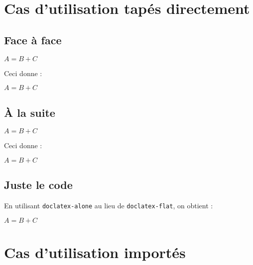 \section{Cas d'utilisation tapés directement}

\subsection{Face à face}

\begin{doclatex-alone}
\begin{doclatex}
    $A = B + C$
\end{doclatex}
\end{doclatex-alone} 

Ceci donne :

\begin{doclatex}
    $A = B + C$
\end{doclatex}




\subsection{À la suite}

\begin{doclatex-alone}
\begin{doclatex-flat}
    $A = B + C$
\end{doclatex-flat}
\end{doclatex-alone}

Ceci donne :

\begin{doclatex-flat}
    $A = B + C$
\end{doclatex-flat}




\subsection{Juste le code}

En utilisant \verb+doclatex-alone+ au lieu de \verb+doclatex-flat+, on obtient :

\begin{doclatex-alone}
    $A = B + C$
\end{doclatex-alone}




\section{Cas d'utilisation importés}

